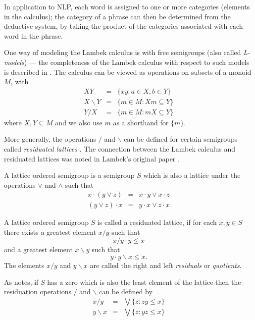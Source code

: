 \documentclass[12pt]{report}
\begin{document}
In application to NLP, each word is assigned to one or more categories (elements in the calculus); the category of a phrase can then be determined from the deductive system, by taking the product of the categories associated with each word in the phrase.

One way of modeling the Lambek calculus is with free semigroups (also called \emph{L-models}) --- the completeness of the Lambek calculus with respect to such models is described in \cite{Pentus:95}. The calculus can be viewed as operations on subsets  of a monoid $M$, with
\begin{eqnarray*}
XY &=& \{xy : a \in X, b \in Y\} \\
X \backslash Y &=& \{m \in M : Xm \subseteq Y\} \\
Y / X &=& \{m \in M : mX \subseteq Y\}
\end{eqnarray*}
where $X,Y\subseteq M$ and we also use $m$ as a shorthand for $\{m\}$.

More generally, the operations $/$ and $\backslash$ can be defined for certain semigroups called \emph{residuated lattices} \citep{Birkhoff:48}. The connection between the Lambek calculus and residuated lattices was noted in Lambek's original paper \citep{Lambek:58}.

\begin{defn}
A lattice ordered semigroup is a semigroup $S$ which is also a lattice under the operations $\lor$ and $\land$ such that
\begin{eqnarray*}
x\cdot (y\lor z) &=& x\cdot y \lor x\cdot z\\
(y\lor z)\cdot x &=& y\cdot x \lor z\cdot x
\end{eqnarray*}
\end{defn}

\begin{defn}
A lattice ordered semigroup $S$ is called a residuated lattice, if for each $x,y \in S$ there exists a greatest element $x/y$ such that
$$x/y \cdot y \le x$$
and a greatest element $x\backslash y$ such that
$$y \cdot y\backslash x \le x.$$
The elements $x/y$ and $y\backslash x$ are called the right and left \emph{residuals} or \emph{quotients}.
\end{defn}

As \cite{Birkhoff:48} notes, if $S$ has a zero which is also the least element of the lattice then the residuation operations $/$ and $\backslash$ can be defined by
\begin{eqnarray*}
x/y &=& \bigvee\{z : zy \le x\}\\
y\backslash x &=& \bigvee\{z : yz \le x\}
\end{eqnarray*}
\end{document}
